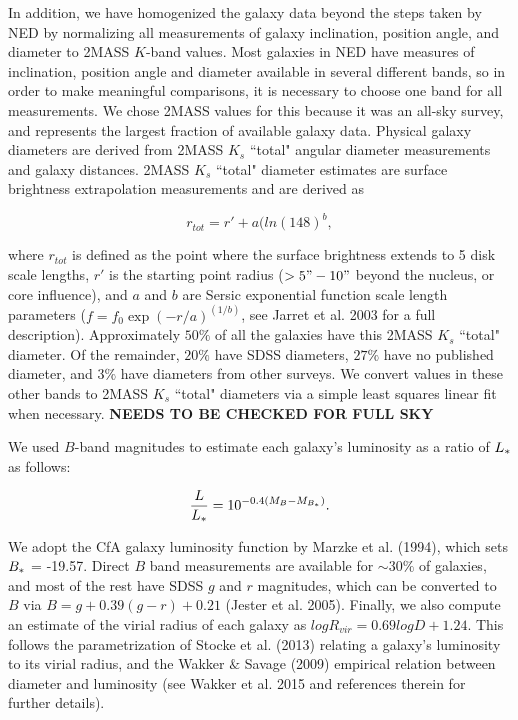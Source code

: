 \documentclass[iop]{emulateapj-rtx4}
\begin{document}
In addition, we have homogenized the galaxy data beyond the steps taken by NED by normalizing all measurements of galaxy inclination, position angle, and diameter to 2MASS $K$-band values. Most galaxies in NED have measures of inclination, position angle and diameter available in several different bands, so in order to make meaningful comparisons, it is necessary to choose one band for all measurements. We chose 2MASS values for this because it was an all-sky survey, and represents the largest fraction of available galaxy data. Physical galaxy diameters are derived from 2MASS $K_s$ ``total" angular diameter measurements and galaxy distances. 2MASS $K_s$ ``total" diameter estimates are surface brightness extrapolation measurements and are derived as 

\begin{equation}
r_{tot} = r' + a(ln(148)^b,
\end{equation}

\noindent where $r_{tot}$ is defined as the point where the surface brightness extends to 5 disk scale lengths, $r'$ is the starting point radius ($>5" - 10"$ beyond the nucleus, or core influence), and $a$ and $b$ are Sersic exponential function scale length parameters ($f = f_0 \exp{(-r/a)}^{(1/b)}$, see Jarret et al. 2003 for a full description). Approximately $50\%$ of all the galaxies have this 2MASS $K_s$ ``total" diameter. Of the remainder, $20\%$ have SDSS diameters, $27\%$ have no published diameter, and $3\%$ have diameters from other surveys. We convert values in these other bands to 2MASS $K_s$ ``total" diameters via a simple least squares linear fit when necessary. \textbf{NEEDS TO BE CHECKED FOR FULL SKY}

We used $B$-band magnitudes to estimate each galaxy's luminosity as a ratio of $L_{\**}$ as follows:

\begin{equation}
	\frac{L}{L_{\**}} = 10^{-0.4 (M_{B} - M_{B_{\**}})}.
\end{equation}

We adopt the CfA galaxy luminosity function by Marzke et al. (1994), which sets $B_{\**} $ = -19.57. Direct $B$ band measurements are available for $\sim 30\%$ of galaxies, and most of the rest have SDSS $g$ and $r$ magnitudes, which can be converted to $B$ via $B = g + 0.39 (g-r) + 0.21$ (Jester et al. 2005). Finally, we also compute an estimate of the virial radius of each galaxy as $log R_{vir} = 0.69 log D + 1.24$. This follows the parametrization of Stocke et al. (2013) relating a galaxy's luminosity to its virial radius, and the Wakker $\&$ Savage (2009) empirical relation between diameter and luminosity (see Wakker et al. 2015 and references therein for further details).
\end{document}
